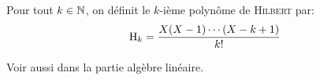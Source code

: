 \begin{tcolorbox}
    Pour tout $k \in \mathbb{N}$, on définit le $k$-ième polynôme de \textsc{Hilbert} par:
    $$\mathrm{H}_k = \frac{X(X-1) \cdots (X-k+1)}{k!}$$
\end{tcolorbox}
Voir aussi  dans la partie algèbre linéaire. 